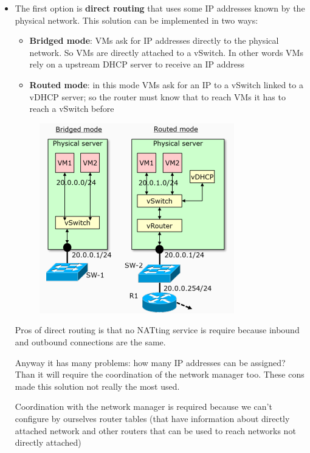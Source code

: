         \begin{itemize}
            \item The first option is \textbf{direct routing} that uses some IP addresses known by the physical network. This solution can be implemented in two ways:
            \FloatBarrier
            \begin{itemize}
                \item \textbf{Bridged mode}: VMs ask for IP addresses directly to the physical network. So VMs are directly attached to a vSwitch. In other words VMs rely on a upstream DHCP server to receive an IP address
                \item \textbf{Routed mode}: in this mode VMs ask for an IP to a vSwitch linked to a vDHCP server; so the router must know that to reach VMs it has to reach a vSwitch before
            \end{itemize}
            
            \begin{figure}[h!]
                \centering
                \includegraphics[scale=0.55]{images/IP ass.png}
            \end{figure}
            \FloatBarrier
            
            Pros of direct routing is that no NATting service is require because inbound and outbound connections are the same.
            
            Anyway it has many problems: how many IP addresses can be assigned? Than it will require the coordination of the network manager too. These cons made this solution not really the most used.
            
            Coordination with the network manager is required because we can't configure by ourselves router tables (that have information about directly attached network and other routers that can be used to reach networks not directly attached)
            

\end{itemize}
